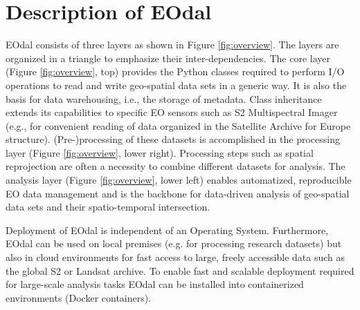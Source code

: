 \section{Description of EOdal}
\label{sec:package_struc}
EOdal consists of three layers as shown in Figure \ref{fig:overview}. The layers are organized in a triangle to emphasize their inter-dependencies. The core layer (Figure \ref{fig:overview}, top) provides the Python classes required to perform I/O operations to read and write geo-spatial data sets in a generic way. It is also the basis for data warehousing, i.e., the storage of metadata. Class inheritance extends its capabilities to specific EO sensors such as S2 Multispectral Imager (e.g., for convenient reading of data organized in the Satellite Archive for Europe structure). (Pre-)processing of these datasets is accomplished in the processing layer (Figure \ref{fig:overview}, lower right). Processing steps such as spatial reprojection are often a necessity to combine different datasets for analysis. The analysis layer (Figure \ref{fig:overview}, lower left) enables automatized, reproducible EO data management and is the backbone for data-driven analysis of geo-spatial data sets and their spatio-temporal intersection.

Deployment of EOdal is independent of an Operating System. Furthermore, EOdal can be used on local premises (e.g. for processing research datasets) but also in cloud environments for fast access to large, freely accessible data such as the global S2 or Landsat archive. To enable fast and scalable deployment required for large-scale analysis tasks EOdal can be installed into containerized environments (Docker containers).


